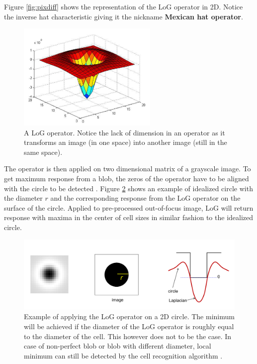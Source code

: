 \documentclass[pdftex,12pt,a4paper]{report}
\begin{document}
Figure \ref{fig:pixdiff} shows the representation of the LoG operator in 2D. Notice the inverse hat characteristic giving it the nickname \textbf{Mexican hat operator}.

\begin{figure}[H]
\centering
\includegraphics[width=0.6\textwidth]{images/log_operator}
\caption{A LoG operator. Notice the lack of dimension in an operator as it transforms an image (in one space) into another image (still in the same space).}
\label{fig:log_operator}
\end{figure}

The operator is then applied on two dimensional matrix of a grayscale image. To get maximum response from a blob, the zeros of the operator have to be aligned with the circle to be detected \cite{marr1980theory}. Figure \ref{fig:log_example} shows an example of idealized circle with the diameter $r$ and the corresponding response from the LoG operator on the surface of the circle. Applied to pre-processed out-of-focus image, LoG will return response with maxima in the center of cell sizes in similar fashion to the idealized circle.

\begin{figure}[H]
\centering
\includegraphics[width=\textwidth]{images/log_operator_example}
\caption[Example of application of the LoG operator]{Example of applying the LoG operator on a 2D circle. The minimum will be achieved if the diameter of the LoG operator is roughly equal to the diameter of the cell. This however does not to be the case. In case of non-perfect blob or blob with different diameter, local minimum can still be detected by the cell recognition algorithm \cite{tinevez2017trackmate}.}
\label{fig:log_example}
\end{figure}
\end{document}

